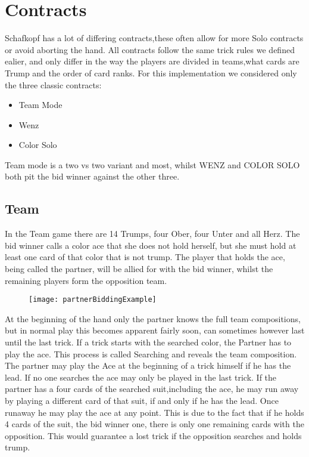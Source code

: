 \section{Contracts}
Schafkopf has a lot of differing contracts,these often allow for more Solo contracts or avoid aborting the hand.
All contracts follow the same trick rules we defined ealier, and only differ in the way the players are divided in
teams,what cards are Trump and the order of card ranks.
For this implementation we considered only the three classic contracts:
\begin{itemize}
    \item Team Mode
    \item Wenz
    \item Color Solo
\end{itemize}
Team mode is a two vs two variant and most, whilst WENZ and COLOR SOLO both pit the bid winner against the other three.

\subsection{Team}
In the Team game there are 14 Trumps, four Ober, four Unter and all Herz.
\newline
The bid winner calls a color ace that she does not hold herself, but she must hold at least one card of that color
that is not trump.
The player that holds the ace, being called the partner, will be allied for with the bid winner, whilst the remaining
players form the opposition team.
\newline
\begin{figure}
    \texttt{[image: partnerBiddingExample]}\label{fig:figure}
\end{figure}
At the beginning of the hand only the partner knows the full team compositions, but in normal play this becomes
apparent fairly soon, can sometimes however last until the last trick.
If a trick starts with the searched color, the Partner has to play the ace.
This process is called Searching and reveals the team composition.
The partner may play the Ace at the beginning of a trick himself if he has the lead.
If no one searches the ace may only be played in the last trick.
If the partner has a four cards of the searched suit,including the ace, he may run away by playing a different card of
that suit, if and only if he has the lead.
Once runaway he may play the ace at any point.
This is due to the fact that if he holds 4 cards of the suit, the bid winner one, there is only one remaining cards
with the opposition.
This would guarantee a lost trick if the opposition searches and holds trump.


